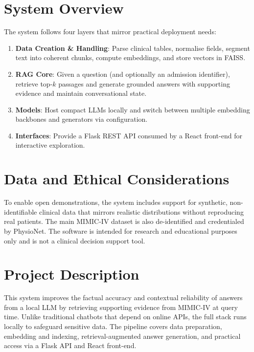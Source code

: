 \section{System Overview}
The system follows four layers that mirror practical deployment needs:
\begin{enumerate}
  \item \textbf{Data Creation \& Handling}: Parse clinical tables, normalise fields, segment text into coherent chunks, compute embeddings, and store vectors in FAISS.
  \item \textbf{RAG Core}: Given a question (and optionally an admission identifier), retrieve top-$k$ passages and generate grounded answers with supporting evidence and maintain conversational state.
  \item \textbf{Models}: Host compact LLMs locally and switch between multiple embedding backbones and generators via configuration.
  \item \textbf{Interfaces}: Provide a Flask REST API consumed by a React front-end for interactive exploration.
\end{enumerate}

\section{Data and Ethical Considerations}
To enable open demonstrations, the system includes support for synthetic, non-identifiable clinical data that mirrors realistic distributions without reproducing real patients. The main MIMIC-IV dataset is also de-identified and credentialed by PhysioNet. The software is intended for research and educational purposes only and is not a clinical decision support tool.

\section{Project Description}
This system improves the factual accuracy and contextual reliability of answers from a local LLM by retrieving supporting evidence from MIMIC-IV at query time. Unlike traditional chatbots that depend on online APIs, the full stack runs locally to safeguard sensitive data. The pipeline covers data preparation, embedding and indexing, retrieval-augmented answer generation, and practical access via a Flask API and React front-end.

